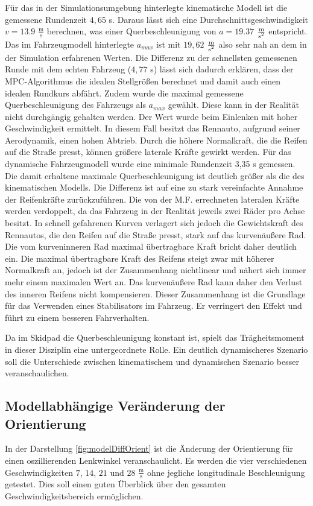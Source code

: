 \documentclass{like}
\begin{document}
Für das in der Simulationsumgebung hinterlegte kinematische Modell ist die gemessene Rundenzeit $4,65$ s. Daraus lässt sich eine Durchschnittsgeschwindigkeit $ v= 13.9$ $ \frac{\text{m}}{\text{s}}$ berechnen, was einer Querbeschleunigung von $a = 19.37$ $ \frac{\text{m}}{\text{s\textsuperscript{2}}}$ entspricht. Das im Fahrzeugmodell hinterlegte $a_{max}$ ist mit $19,62$ $ \frac{\text{m}}{\text{s\textsuperscript{2}}}$ also sehr nah an dem in der Simulation erfahrenen Werten. Die Differenz zu der schnellsten gemessenen Runde mit dem echten Fahrzeug ($4,77$ s) lässt sich dadurch erklären, dass der MPC-Algorithmus die idealen Stellgrößen berechnet und damit auch einen idealen Rundkurs abfährt. Zudem wurde die maximal gemessene Querbeschleunigung des Fahrzeugs als $a_{max}$ gewählt. Diese kann in der Realität nicht durchgängig gehalten werden. Der Wert wurde beim Einlenken mit hoher Geschwindigkeit ermittelt. In diesem Fall besitzt das Rennauto, aufgrund seiner Aerodynamik, einen hohen Abtrieb. Durch die höhere Normalkraft, die die Reifen auf die Straße presst, können größere laterale Kräfte gewirkt werden.
Für das dynamische Fahrzeugmodell wurde eine minimale Rundenzeit 3,35 s gemessen.  Die damit erhaltene maximale Querbeschleunigung ist deutlich größer als die des kinematischen Modells. Die Differenz ist auf eine zu stark vereinfachte Annahme der Reifenkräfte zurückzuführen. Die von der \ac{M.F.} errechneten lateralen Kräfte werden verdoppelt, da das Fahrzeug in der Realität jeweils zwei Räder pro Achse besitzt. In schnell gefahrenen Kurven verlagert sich jedoch die Gewichtskraft des Rennautos, die den Reifen auf die Straße presst, stark auf das kurvenäußere Rad. Die vom kurveninneren Rad maximal übertragbare Kraft bricht daher deutlich ein.
Die maximal übertragbare Kraft des Reifens steigt zwar mit höherer Normalkraft an, jedoch ist der Zusammenhang nichtlinear und nähert sich immer mehr einem maximalen Wert an. Das kurvenäußere Rad kann daher den Verlust des inneren Reifens nicht kompensieren. Dieser Zusammenhang ist die Grundlage für das Verwenden eines Stabilisators im Fahrzeug. Er verringert den Effekt und führt zu einem besseren Fahrverhalten.

Da im Skidpad die Querbeschleunigung konstant ist, spielt das Trägheitsmoment in dieser Disziplin eine untergeordnete Rolle.
Ein deutlich dynamischeres Szenario soll die Unterschiede zwischen kinematischem und dynamischen Szenario besser veranschaulichen.

\subsection{Modellabhängige Veränderung der Orientierung}
In der Darstellung \ref{fig:modelDiffOrient} ist die Änderung der Orientierung für einen oszillierenden Lenkwinkel veranschaulicht. Es werden die vier verschiedenen Geschwindigkeiten $7$, $14$, $21$ und $28$ $\frac{\text{m}}{\text{s}}$ ohne jegliche longitudinale Beschleunigung getestet. Dies soll einen guten Überblick über den gesamten Geschwindigkeitsbereich ermöglichen.
\end{document}
